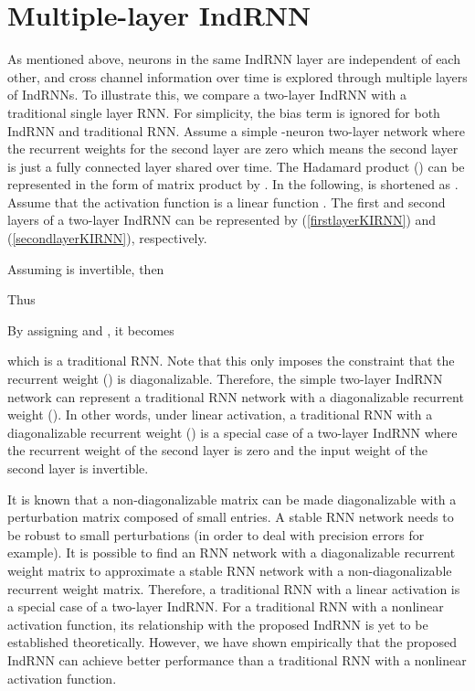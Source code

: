 \documentclass[10pt,twocolumn,letterpaper]{article}
\begin{document}
\section{Multiple-layer IndRNN}
\label{relationRNN}
As mentioned above, neurons in the same IndRNN layer are independent of each other, and cross channel information over time is explored through multiple layers of IndRNNs. To illustrate this, we compare a two-layer IndRNN with a traditional single layer RNN. For simplicity, the bias term is ignored for both IndRNN and traditional RNN. Assume a simple -neuron two-layer network where the recurrent weights for the second layer are zero which means the second layer is just a fully connected layer shared over time. The Hadamard product () can be represented in the form of matrix product by . In the following,  is shortened as . Assume that the activation function is a linear function . The first and second layers of a two-layer IndRNN can be represented by (\ref{firstlayerKIRNN}) and (\ref{secondlayerKIRNN}), respectively. 

Assuming  is invertible, then 

Thus


By assigning  and , it becomes

which is a traditional RNN. Note that this only imposes the constraint that the recurrent weight () is diagonalizable. Therefore, the simple two-layer IndRNN network can represent a traditional RNN network with a diagonalizable recurrent weight (). In other words, under linear activation, a traditional RNN with a diagonalizable recurrent weight () is a special case of a two-layer IndRNN where the recurrent weight of the second layer is zero and the input weight of the second layer is invertible. 

It is known that a non-diagonalizable matrix can be made diagonalizable with a perturbation matrix composed of small entries. A stable RNN network needs to be robust to small perturbations (in order to deal with precision errors for example). It is possible to find an RNN network with a diagonalizable recurrent weight matrix to approximate a stable RNN network with a non-diagonalizable recurrent weight matrix. Therefore, a traditional RNN with a linear activation is a special case of a two-layer IndRNN. For a traditional RNN with a nonlinear activation function, its relationship with the proposed IndRNN is yet to be established theoretically. However, we have shown empirically that the proposed IndRNN can achieve better performance than a traditional RNN with a nonlinear activation function.
\end{document}

